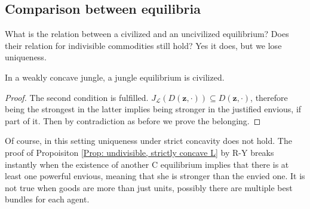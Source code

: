 \subsection{Comparison between equilibria}

What is the relation between a civilized and an uncivilized equilibrium? Does their relation for indivisible commodities still hold? Yes it does, but we lose uniqueness.

\begin{proposition}\label{Prop: jungle eq is C in weakly concave}
In a weakly concave jungle, a jungle equilibrium is civilized.

    \begin{proof}
        The second condition is fulfilled. $J_{\mathcal{L}}(D(\textbf{z},\cdot))\subseteq D(\textbf{z},\cdot)$, therefore being the strongest in the latter implies being stronger in the justified envious, if part of it. Then by contradiction as before we prove the belonging.
    \end{proof}
\end{proposition}

Of course, in this setting uniqueness under strict concavity does not hold. The proof of Propoisiton \ref{Prop: undivisible, strictly concave L} by R-Y\cite{RY} breaks instantly when the existence of another C equilibrium implies that there is at least one powerful envious, meaning that she is stronger than the envied one. It is not true when goods are more than just units, possibly there are multiple best bundles for each agent.